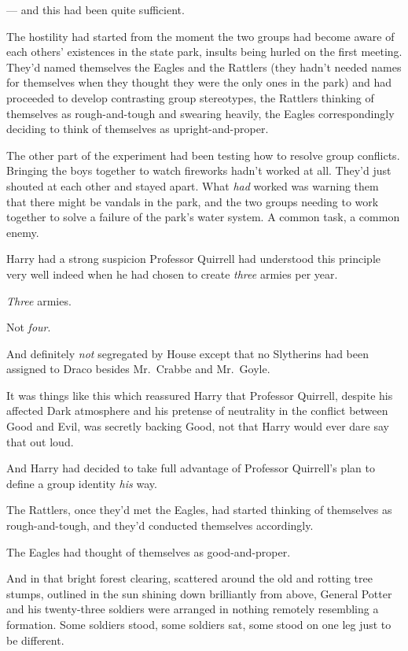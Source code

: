 --- and this had been quite sufficient.

The hostility had started from the moment the two groups had become aware of
each others' existences in the state park, insults being hurled on the first
meeting. They'd named themselves the Eagles and the Rattlers (they hadn't
needed names for themselves when they thought they were the only ones in the
park) and had proceeded to develop contrasting group stereotypes, the Rattlers
thinking of themselves as rough-and-tough and swearing heavily, the Eagles
correspondingly deciding to think of themselves as upright-and-proper.

The other part of the experiment had been testing how to resolve group
conflicts. Bringing the boys together to watch fireworks hadn't worked at all.
They'd just shouted at each other and stayed apart. What \emph{had} worked was
warning them that there might be vandals in the park, and the two groups
needing to work together to solve a failure of the park's water system. A
common task, a common enemy.

Harry had a strong suspicion Professor Quirrell had understood this principle
very well indeed when he had chosen to create \emph{three} armies per year.

\emph{Three} armies.

Not \emph{four}.

And definitely \emph{not} segregated by House{\el} except that no Slytherins
had been assigned to Draco besides Mr.~Crabbe and Mr.~Goyle.

It was things like this which reassured Harry that Professor Quirrell, despite
his affected Dark atmosphere and his pretense of neutrality in the conflict
between Good and Evil, was secretly backing Good, not that Harry would ever
dare say that out loud.

And Harry had decided to take full advantage of Professor Quirrell's plan to
define a group identity \emph{his} way.

The Rattlers, once they'd met the Eagles, had started thinking of themselves as
rough-and-tough, and they'd conducted themselves accordingly.

The Eagles had thought of themselves as good-and-proper.

And in that bright forest clearing, scattered around the old and rotting tree
stumps, outlined in the sun shining down brilliantly from above, General Potter
and his twenty-three soldiers were arranged in nothing remotely resembling a
formation. Some soldiers stood, some soldiers sat, some stood on one leg just
to be different.

